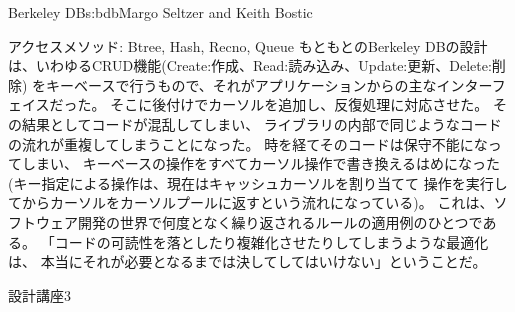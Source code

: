 \begin{aosachapter}{Berkeley DB}{s:bdb}{Margo Seltzer and Keith Bostic}
\begin{aosasect1}{アクセスメソッド: Btree, Hash, Recno, Queue}
もともとのBerkeley DBの設計は、いわゆるCRUD機能(Create:作成、Read:読み込み、Update:更新、Delete:削除)
をキーベースで行うもので、それがアプリケーションからの主なインターフェイスだった。
そこに後付けでカーソルを追加し、反復処理に対応させた。
その結果としてコードが混乱してしまい、
ライブラリの内部で同じようなコードの流れが重複してしまうことになった。
時を経てそのコードは保守不能になってしまい、
キーベースの操作をすべてカーソル操作で書き換えるはめになった
(キー指定による操作は、現在はキャッシュカーソルを割り当てて
操作を実行してからカーソルをカーソルプールに返すという流れになっている)。
これは、ソフトウェア開発の世界で何度となく繰り返されるルールの適用例のひとつである。
「コードの可読性を落としたり複雑化させたりしてしまうような最適化は、
本当にそれが必要となるまでは決してしてはいけない」ということだ。

\begin{aosabox}{設計講座3}


\end{aosabox}
\end{aosasect1}
\end{aosachapter}
